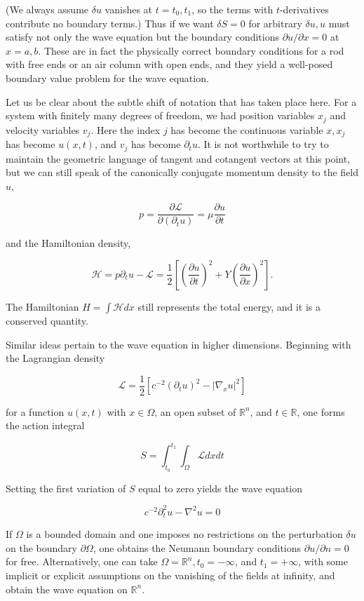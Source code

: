 \documentclass[10pt, letterpaper]{article}
\begin{document}
(We always assume $\delta u$ vanishes at $t=t_{0}, t_{1}$, so the terms with $t$-derivatives contribute no boundary terms.) Thus if we want $\delta S=0$ for arbitrary $\delta u, u$ must satisfy not only the wave equation but the boundary conditions $\partial u / \partial x=0$ at $x=a, b$. These are in fact the physically correct boundary conditions for a rod with free ends or an air column with open ends, and they yield a well-posed boundary value problem for the wave equation.

Let us be clear about the subtle shift of notation that has taken place here. For a system with finitely many degrees of freedom, we had position variables $x_{j}$ and velocity variables $v_{j}$. Here the index $j$ has become the continuous variable $x, x_{j}$ has become $u(x, t)$, and $v_{j}$ has become $\partial_{t} u$. It is not worthwhile to try to maintain the geometric language of tangent and cotangent vectors at this point, but we can still speak of the canonically conjugate momentum density to the field $u$,

$$
p=\frac{\partial \mathcal{L}}{\partial\left(\partial_{t} u\right)}=\mu \frac{\partial u}{\partial t}
$$

and the Hamiltonian density,

$$
\mathcal{H}=p \partial_{t} u-\mathcal{L}=\frac{1}{2}\left[\left(\frac{\partial u}{\partial t}\right)^{2}+Y\left(\frac{\partial u}{\partial x}\right)^{2}\right] .
$$

The Hamiltonian $H=\int \mathcal{H} d x$ still represents the total energy, and it is a conserved quantity.

Similar ideas pertain to the wave equation in higher dimensions. Beginning with the Lagrangian density

$$
\mathcal{L}=\frac{1}{2}\left[c^{-2}\left(\partial_{t} u\right)^{2}-\left|\nabla_{x} u\right|^{2}\right]
$$

for a function $u(x, t)$ with $x \in \Omega$, an open subset of $\mathbb{R}^{n}$, and $t \in \mathbb{R}$, one forms the action integral

$$
S=\int_{t_{0}}^{t_{1}} \int_{\Omega} \mathcal{L} d x d t
$$

Setting the first variation of $S$ equal to zero yields the wave equation

$$
c^{-2} \partial_{t}^{2} u-\nabla^{2} u=0
$$

If $\Omega$ is a bounded domain and one imposes no restrictions on the perturbation $\delta u$ on the boundary $\partial \Omega$, one obtains the Neumann boundary conditions $\partial u / \partial n=0$ for free. Alternatively, one can take $\Omega=\mathbb{R}^{n}, t_{0}=-\infty$, and $t_{1}=+\infty$, with some implicit or explicit assumptions on the vanishing of the fields at infinity, and obtain the wave equation on $\mathbb{R}^{n}$.
\end{document}
